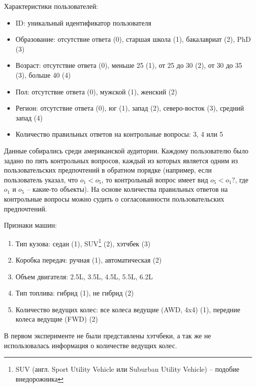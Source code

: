 		\vspace{1em}
		
		\noindent Характеристики пользователей:
		\vspace{-0.7em}
		\begin{itemize}[itemsep=-1.5mm]
			\item ID: уникальный идентификатор пользователя
			\item Образование: отсутствие ответа (0), старшая школа (1), бакалавриат (2), PhD (3)
			\item Возраст: отсутствие ответа (0), меньше 25 (1), от 25 до 30 (2), от 30 до 35 (3), больше 40 (4)
			\item Пол: отсутствие ответа (0), мужской (1), женский (2)
			\item Регион: отсутствие ответа (0), юг (1), запад (2), северо-восток (3), средний запад (4)
			\item Количество правильных ответов на контрольные вопросы: 3, 4 или 5
		\end{itemize}
		Данные собирались среди американской аудитории. Каждому пользователю было задано по пять контрольных вопросов, каждый из которых является одним из пользовательских предпочтений в обратном порядке (например, если пользователь указал, что $o_1 < o_5$, то контрольный вопрос имеет вид $o_5 < o_1?$, где $o_1$ и $o_5$ – какие-то объекты). На основе количества правильных ответов на контрольные вопросы можно судить о согласованности пользовательских предпочтений.
		
		\vspace{1em}
		
		\noindent Признаки машин:
		\vspace{-0.7em}
		\begin{enumerate}[itemsep=-1.5mm]
			\item Тип кузова: седан (1), SUV\footnote{SUV (англ. Sport Utility Vehicle или Suburban Utility Vehicle) – подобие внедорожника} (2), хэтчбек (3)
			\item Коробка передач: ручная (1), автоматическая (2)
			\item Объем двигателя: 2.5L, 3.5L, 4.5L, 5.5L, 6.2L
			\item Тип топлива: гибрид (1), не гибрид (2)
			\item Количество ведущих колес: все колеса ведущие (AWD, 4x4) (1), передние колеса ведущие (FWD) (2)
		\end{enumerate} 
		В первом эксперименте не были представлены хэтчбеки, а так же не использовалась информация о количестве ведущих колес.
	

